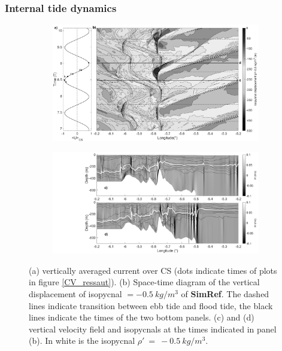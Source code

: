 \documentclass[a4paper,12pt]{article}
\begin{document}
\subsubsection{Internal tide dynamics}
\begin{figure}[!t]
\centering
\begin{subfigure}{1\linewidth}
\centering
\includegraphics[width=1\linewidth]{hov_ref_-05.png}
\end{subfigure}

\begin{subfigure}{1\linewidth}
   \centering
  \includegraphics[width=\textwidth]{RW_J4_9h12-15h48.png}
\end{subfigure}
 \caption {(a) vertically averaged current over CS (dots indicate times of plots in figure \ref{CV_ressaut}). (b) Space-time diagram of the vertical displacement of isopycnal $=-0.5 \ kg/m^3$ of \textbf{SimRef}. The dashed lines indicate transition between ebb tide and flood tide, the black lines indicate the times of the two bottom panels. (c) and (d) vertical velocity field and isopycnals at the times indicated in panel (b). In white is the isopycnal $\rho'\ =\ -0.5 \ kg/m^3 $.}
 \label{hov_ref}
\end{figure}
\end{document}
